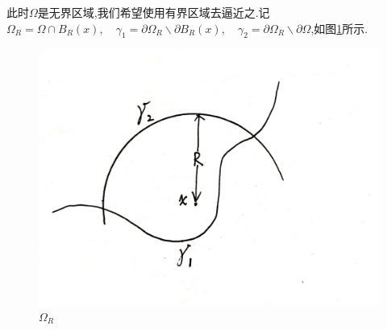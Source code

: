 \documentclass[12pt, a4paper]{ctexart}
\begin{document}
	此时$\Omega$是无界区域,我们希望使用有界区域去逼近之.记$\Omega_R=\Omega \cap B_R(x) ,\quad \gamma_1= \partial\Omega_R \backslash \partial B_R(x) ,\quad \gamma_2= \partial\Omega_R \backslash \partial \Omega $,如图\ref{pde1_4_6}所示.
	\begin{figure}[htbp]
		\centering
		\includegraphics[scale=0.05]{PDE1_4_6.jpg}
        \caption{$\Omega_R$}
        \label{pde1_4_6}
	\end{figure}
	
\end{document}
